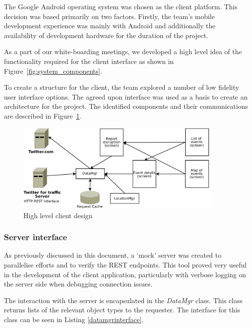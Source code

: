 The Google Android operating system was chosen as the client platform. This
decision was based primarily on two factors. Firstly, the team's mobile
development experience was mainly with Android and additionally the
availability of development hardware for the duration of the project.

As a part of our white-boarding meetings, we developed a high level idea of the
functionality required for the client interface as shown in
Figure~\ref{fig:system_components}.

To create a structure for the client, the team explored a number of low fidelity
user interface options. The agreed upon interface was used as a basis to create
an architecture for the project. The identified components and their
communications are described in Figure~\ref{fig:client_design}.

\begin{figure}[htb]
\centering
\includegraphics[width=0.9\textwidth]{images/design/client/client_high_level_layout.pdf}
\caption{High level client design}
\label{fig:client_design}
\end{figure}


\subsubsection{Server interface}
As previously discussed in this document, a ‘mock’ server was created to
parallelise efforts and to verify the REST endpoints. This tool proved very
useful in the development of the client application, particularly with verbose
logging on the server side when debugging connection issues.

The interaction with the server is encapsulated in the \emph{DataMgr} class.
This class returns lists of the relevant object types to the requester. The
interface for this class can be seen in Listing \ref{datamgrinterface}.


